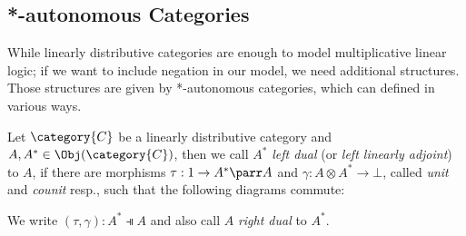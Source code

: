 \documentclass[DIN, pagenumber=false, fontsize=11pt, parskip=half, colorinlistoftodos, svgnames]{scrartcl}
\newcommand{\formatnote}[2][]{\todo[color=cyan!40, #1]{#2}}
\begin{document}
	\subsection{*-autonomous Categories}
	\label{subsec: autoCats}
	
	While linearly distributive categories are enough to  model multiplicative linear logic; if we want to include negation in our model, we need additional structures. Those structures are given by *-autonomous categories, which can defined in various ways.
	
	\begin{definition}
		\label{def: dualObj}
		Let $\category{C} $ be a linearly distributive category and $A, A^* \in \Obj(\category{C}) $, then we call $A^* $ \emph{left dual} (or \emph{left linearly adjoint}) to $A$, if there are morphisms $\tau: 1 \rightarrow A^* \parr A$ and $\gamma: A \otimes A^* \rightarrow \bot $, called \emph{unit} and \emph{counit} resp., such that the following diagrams commute:
		\begin{center}
		\end{center}
		
		We write $(\tau, \gamma): A^* \dashV A $ and also call $A$ \emph{right dual} to $A^*$. 
		
	\end{definition}
	
\end{document}
